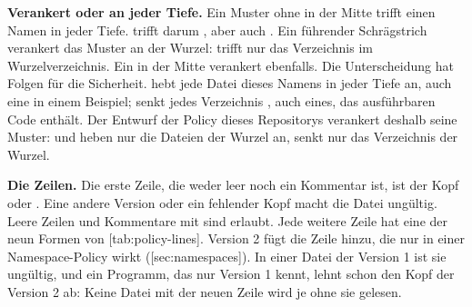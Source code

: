 {\bf Verankert oder an jeder Tiefe.}
Ein Muster ohne \type{/} in der Mitte trifft einen Namen in jeder Tiefe.
 trifft darum , aber auch .
Ein führender Schrägstrich verankert das Muster an der Wurzel:
 trifft nur das Verzeichnis  im Wurzelverzeichnis.
Ein \type{/} in der Mitte verankert ebenfalls.
Die Unterscheidung hat Folgen für die Sicherheit.
 hebt jede Datei dieses Namens in jeder Tiefe an,
auch eine in einem Beispiel;
 senkt jedes Verzeichnis , auch eines, das ausführbaren Code
enthält.
Der Entwurf der Policy dieses Repositorys verankert deshalb seine Muster:
 und  heben nur die Dateien der Wurzel an,
 senkt nur das Verzeichnis der Wurzel.

{\bf Die Zeilen.}
Die erste Zeile, die weder leer noch ein Kommentar ist, ist der Kopf 
oder .
Eine andere Version oder ein fehlender Kopf macht die Datei ungültig.
Leere Zeilen und Kommentare mit \type{\#} sind erlaubt.
Jede weitere Zeile hat eine der neun Formen von [tab:policy-lines].
Version 2 fügt die Zeile  hinzu, die nur in einer
Namespace-Policy wirkt ([sec:namespaces]).
In einer Datei der Version 1 ist sie ungültig, und ein Programm, das nur Version 1 kennt, lehnt
schon den Kopf der Version 2 ab:
Keine Datei mit der neuen Zeile wird je ohne sie gelesen.


